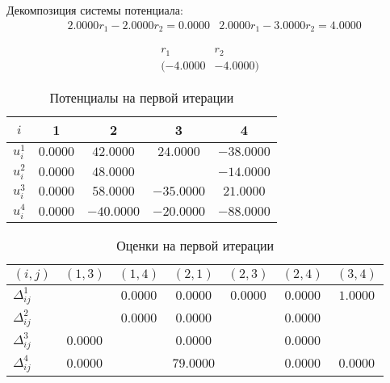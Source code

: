 \documentclass[a4paper,14pt,usenames,dvipsnames]{extreport}
\begin{document}
Декомпозиция системы потенциала:
$$
\begin{aligned}
&2.0000 r_{1} - 2.0000 r_{2} = 0.0000
&2.0000 r_{1} - 3.0000 r_{2} = 4.0000
\end{aligned}
$$

$$
\begin{array}{cc}
r_{1} & r_{2}\\
(-4.0000 & -4.0000)
\end{array}
$$


\begin{table}[H] 
\renewcommand{\arraystretch}{1.3}
\caption{Потенциалы на первой итерации} \label{tab:t11}
\begin{center}
\begin{tabular}{|c|c|c|c|c|}
\hline$i$ & 1 & 2 & 3 & 4\\
\hline$u_{i}^{1}$ & $0.0000$ & $42.0000$ & $24.0000$ & $-38.0000$\\
\hline$u_{i}^{2}$ & $0.0000$ & $48.0000$ & & $-14.0000$\\
\hline$u_{i}^{3}$ & $0.0000$ & $58.0000$ & $-35.0000$ & $21.0000$\\
\hline$u_{i}^{4}$ & $0.0000$ & $-40.0000$ & $-20.0000$ & $-88.0000$\\
\hline
\end{tabular}
\end{center}
\end{table}

\begin{table}[H] 
\renewcommand{\arraystretch}{1.3}
\caption{Оценки на первой итерации} \label{tab:t11}
\begin{center}
\begin{tabular}{|l|c|c|c|c|c|c|}
\hline$(i, j)$ & $(1,3)$ & $(1,4)$ & $(2,1)$ & $(2,3)$ & $(2,4)$ & $(3,4)$\\
\hline$\Delta_{i j}^{1}$ & & $0.0000$ & $0.0000$ & $0.0000$ & $0.0000$ & $1.0000$\\
\hline$\Delta_{i j}^{2}$ & & $0.0000$ & $0.0000$ & & $0.0000$ & \\
\hline$\Delta_{i j}^{3}$ & $0.0000$ & & $0.0000$ & & $0.0000$ & \\
\hline$\Delta_{i j}^{4}$ & $0.0000$ & & $79.0000$ & & $0.0000$ & $0.0000$\\
\hline
\end{tabular}
\end{center}
\end{table}
\end{document}
